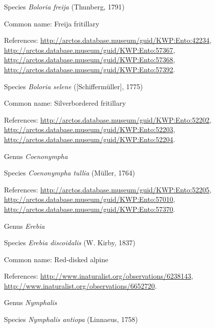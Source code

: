 \documentclass[9pt, article]{memoir}
\begin{document}
\begin{multicols}{2}
\vspace{6pt}\noindent\hspace{36pt}Species \textit{Boloria freija} (Thunberg, 1791)


Common name: Freija fritillary

References: 
\url{http://arctos.database.museum/guid/KWP:Ento:42234}, 
\url{http://arctos.database.museum/guid/KWP:Ento:57367}, 
\url{http://arctos.database.museum/guid/KWP:Ento:57368}, 
\url{http://arctos.database.museum/guid/KWP:Ento:57392}.

\vspace{6pt}\noindent\hspace{36pt}Species \textit{Boloria selene} ([Schiffermüller], 1775)


Common name: Silverbordered fritillary

References: 
\url{http://arctos.database.museum/guid/KWP:Ento:52202}, 
\url{http://arctos.database.museum/guid/KWP:Ento:52203}, 
\url{http://arctos.database.museum/guid/KWP:Ento:52204}.

\vspace{6pt}\noindent\hspace{30pt}Genus \textit{Coenonympha}


\vspace{6pt}\noindent\hspace{36pt}Species \textit{Coenonympha tullia} (Müller, 1764)


References: 
\url{http://arctos.database.museum/guid/KWP:Ento:52205}, 
\url{http://arctos.database.museum/guid/KWP:Ento:57010}, 
\url{http://arctos.database.museum/guid/KWP:Ento:57370}.

\vspace{6pt}\noindent\hspace{30pt}Genus \textit{Erebia}


\vspace{6pt}\noindent\hspace{36pt}Species \textit{Erebia discoidalis} (W. Kirby, 1837)


Common name: Red-disked alpine

References: 
\url{http://www.inaturalist.org/observations/6238143}, 
\url{http://www.inaturalist.org/observations/6652720}.

\vspace{6pt}\noindent\hspace{30pt}Genus \textit{Nymphalis}


\vspace{6pt}\noindent\hspace{36pt}Species \textit{Nymphalis antiopa} (Linnaeus, 1758)



\end{multicols}
\end{document}

